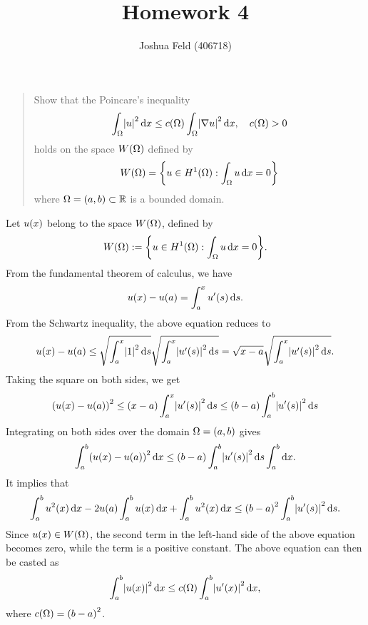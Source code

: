 \documentclass[english]{exercise}
\title{Homework 4}
\author{Joshua Feld (406718)}
\begin{document}
	\maketitle


	\section{}

	\begin{quote}
		Show that the Poincare's inequality
		\[
			\int_\Omega \absolute*{u}^2 \d x \le c\parentheses*{\Omega}\int_\Omega \absolute*{\nabla u}^2 \d x, \quad c\parentheses*{\Omega} > 0
		\]
		holds on the space \(W\parentheses*{\Omega}\) defined by
		\[
			W\parentheses*{\Omega} = \braces*{u \in H^1\parentheses*{\Omega} : \int_\Omega u\d x = 0}
		\]
		where \(\Omega = \parentheses*{a, b} \subset \R\) is a bounded domain.
	\end{quote}

	Let \(u\parentheses*{x}\) belong to the space \(W\parentheses*{\Omega}\), defined by
	\[
		W\parentheses*{\Omega} := \braces*{u \in H^1\parentheses*{\Omega} : \int_\Omega u\d x = 0}.
	\]
	From the fundamental theorem of calculus, we have
	\[
		u\parentheses*{x} - u\parentheses*{a} = \int_a^x u'\parentheses*{s}\d s.
	\]
	From the Schwartz inequality, the above equation reduces to
	\[
		u\parentheses*{x} - u\parentheses*{a} \le \sqrt{\int_a^x \absolute*{1}^2 \d s}\sqrt{\int_a^x \absolute*{u'\parentheses*{s}}^2 \d s} = \sqrt{x - a}\sqrt{\int_a^x \absolute*{u'\parentheses*{s}}^2 \d s}.
	\]
	Taking the square on both sides, we get
	\[
		\parentheses*{u\parentheses*{x} - u\parentheses*{a}}^2 \le \parentheses*{x - a}\int_a^x \absolute*{u'\parentheses*{s}}^2 \d s \le \parentheses*{b - a}\int_a^b \absolute*{u'\parentheses*{s}}^2 \d s
	\]
	Integrating on both sides over the domain \(\Omega = \parentheses*{a, b}\) gives
	\[
		\int_a^b \parentheses*{u\parentheses*{x} - u\parentheses*{a}}^2 \d x \le \parentheses*{b - a}\int_a^b \absolute*{u'\parentheses*{s}}^2 \d s\int_a^b \d x.
	\]
	It implies that
	\[
		\int_a^b u^2\parentheses*{x}\d x - 2u\parentheses*{a}\int_a^b u\parentheses*{x}\d x + \int_a^b u^2\parentheses*{x}\d x \le \parentheses*{b - a}^2 \int_a^b \absolute*{u'\parentheses*{s}}^2 \d s.
	\]
	Since \(u\parentheses*{x} \in W\parentheses*{\Omega}\), the second term in the left-hand side of the above equation becomes zero, while the term is a positive constant.
	The above equation can then be casted as
	\[
		\int_a^b \absolute*{u\parentheses*{x}}^2 \d x \le c\parentheses*{\Omega}\int_a^b \absolute*{u'\parentheses*{x}}^2 \d x,
	\]
	where \(c\parentheses*{\Omega} = \parentheses*{b - a}^2\).
\end{document}
